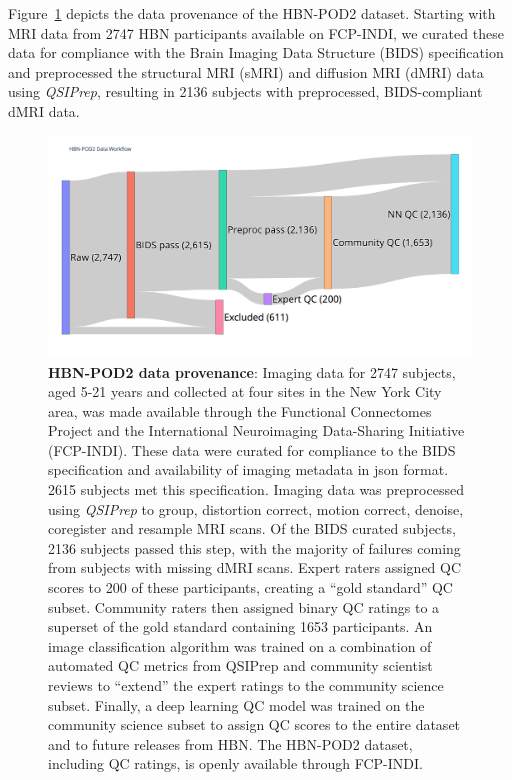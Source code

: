\documentclass[fleqn,10pt]{wlscirep}
\begin{document}
Figure~\ref{fig:hbn-sankey} depicts the data provenance of the HBN-POD2 dataset.
Starting with MRI data from \num{2747} HBN participants available on FCP-INDI,
we curated these data for compliance with the Brain Imaging Data Structure
(BIDS) specification \cite{gorgolewski2016-lh} and preprocessed the structural
MRI (sMRI) and diffusion MRI (dMRI) data using \emph{QSIPrep}, resulting in
\num{2136} subjects with preprocessed, BIDS-compliant dMRI data.

\begin{figure}[ht]
    \centering
    \includegraphics[width=0.75\linewidth]{hbn-pod2-sankey.png}
    \caption{%
        {\bf HBN-POD2 data provenance}:
        Imaging data for \num{2747} subjects, aged 5-21 years and collected at four
        sites in the New York City area, was made available through the
        Functional Connectomes Project and the International Neuroimaging
        Data-Sharing Initiative (FCP-INDI).
        These data were curated for compliance to the BIDS specification
        \cite{gorgolewski2016-lh} and availability of imaging metadata in json
        format. \num{2615} subjects met this specification.
        Imaging data was preprocessed using \emph{QSIPrep} \cite{cieslak2021-iq}
        to group, distortion correct, motion correct, denoise, coregister and
        resample MRI scans. Of the BIDS curated subjects, \num{2136} subjects
        passed this step, with the majority of failures coming from subjects
        with missing dMRI scans.
        Expert raters assigned QC scores to \num{200} of these participants,
        creating a ``gold standard'' QC subset. Community raters then assigned
        binary QC ratings to a superset of the gold standard containing
        \num{1653} participants. An image classification algorithm was trained
        on a combination of automated QC metrics from QSIPrep and community
        scientist reviews to ``extend'' the expert ratings to the community
        science subset.  Finally, a deep learning QC model was trained on the
        community science subset to assign QC scores to the entire dataset and
        to future releases from HBN.
        The HBN-POD2 dataset, including QC ratings, is openly available through
        FCP-INDI.
    }
    \label{fig:hbn-sankey}
\end{figure}
\end{document}
